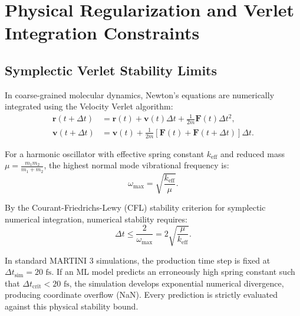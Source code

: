 \documentclass[11pt,a4paper]{article}
\begin{document}
\section{Physical Regularization and Verlet Integration Constraints}
\label{sec:physics}

\subsection{Symplectic Verlet Stability Limits}
In coarse-grained molecular dynamics, Newton's equations are numerically integrated using the Velocity Verlet algorithm:
\begin{align}
\mathbf{r}(t + \Delta t) &= \mathbf{r}(t) + \mathbf{v}(t)\Delta t + \frac{1}{2m} \mathbf{F}(t)\Delta t^2, \\
\mathbf{v}(t + \Delta t) &= \mathbf{v}(t) + \frac{1}{2m} [\mathbf{F}(t) + \mathbf{F}(t + \Delta t)]\Delta t.
\end{align}

For a harmonic oscillator with effective spring constant $k_{\text{eff}}$ and reduced mass $\mu = \frac{m_1 m_2}{m_1 + m_2}$, the highest normal mode vibrational frequency is:
\begin{equation}
\omega_{\max} = \sqrt{\frac{k_{\text{eff}}}{\mu}}.
\end{equation}

By the Courant-Friedrichs-Lewy (CFL) stability criterion for symplectic numerical integration, numerical stability requires:
\begin{equation}
\Delta t \le \frac{2}{\omega_{\max}} = 2 \sqrt{\frac{\mu}{k_{\text{eff}}}}.
\label{eq:verlet_criterion}
\end{equation}

In standard MARTINI 3 simulations, the production time step is fixed at $\Delta t_{\text{sim}} = 20\text{ fs}$. If an ML model predicts an erroneously high spring constant such that $\Delta t_{\text{crit}} < 20\text{ fs}$, the simulation develops exponential numerical divergence, producing coordinate overflow (NaN). Every prediction is strictly evaluated against this physical stability bound.
\end{document}
